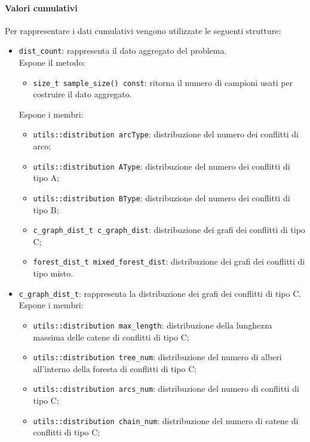 \documentclass[../../../relazione.tex]{subfiles}
\begin{document}
\paragraph{Valori cumulativi}
Per rappresentare i dati cumulativi vengono utilizzate le seguenti strutture:
\begin{itemize}
    \item \texttt{dist\_count}: rappresenta il dato aggregato del problema. \\
          Espone il metodo:
          \begin{itemize}
              \item \texttt{size\_t sample\_size() const}: ritorna il numero di campioni usati per costruire il dato aggregato.
          \end{itemize}
          Espone i membri:
          \begin{itemize}
              \item \texttt{utils::distribution arcType}: distribuzione del numero dei conflitti di arco;
              \item \texttt{utils::distribution AType}: distribuzione del numero dei conflitti di tipo A;
              \item \texttt{utils::distribution BType}: distribuzione del numero dei conflitti di tipo B;
              \item \texttt{c\_graph\_dist\_t c\_graph\_dist}: distribuzione dei grafi dei conflitti di tipo C;
              \item \texttt{forest\_dist\_t mixed\_forest\_dist}: distribuzione dei grafi dei conflitti di tipo misto.
          \end{itemize}
    \item \texttt{c\_graph\_dist\_t}: rappresenta la distribuzione dei grafi dei conflitti di tipo C. \\
          Espone i membri:
          \begin{itemize}
              \item \texttt{utils::distribution max\_length}: distribuzione della lunghezza massima delle catene di conflitti di tipo C;
              \item \texttt{utils::distribution tree\_num}: distribuzione del numero di alberi all'interno della foresta di conflitti di tipo C;
              \item \texttt{utils::distribution arcs\_num}: distribuzione del numero di conflitti di tipo C;
              \item \texttt{utils::distribution chain\_num}: distribuzione del numero di catene di conflitti di tipo C;

\end{itemize}
\end{itemize}
\end{document}
